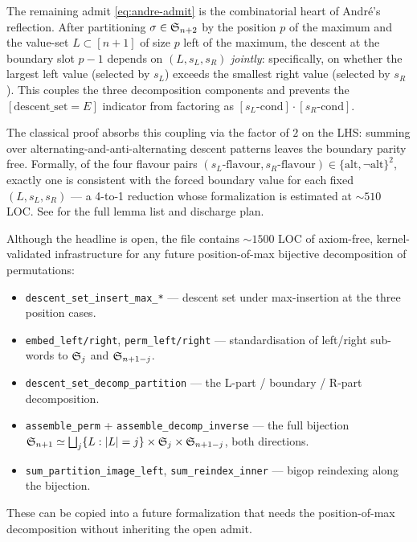 \begin{remark}
  The remaining admit \eqref{eq:andre-admit} is the combinatorial heart
  of André's reflection.  After partitioning $\sigma \in \mathfrak{S}_{n+2}$ by
  the position $p$ of the maximum and the value-set $L \subset [n+1]$
  of size $p$ left of the maximum, the descent at the boundary slot
  $p-1$ depends on $(L, s_L, s_R)$ \emph{jointly}: specifically, on
  whether the largest left value (selected by $s_L$) exceeds the
  smallest right value (selected by $s_R$).  This couples the three
  decomposition components and prevents the $[\mathrm{descent\_set} = E]$
  indicator from factoring as $[s_L\text{-cond}] \cdot [s_R\text{-cond}]$.

  The classical proof absorbs this coupling via the factor of $2$ on
  the LHS: summing over alternating-and-anti-alternating descent
  patterns leaves the boundary parity free.  Formally, of the four
  flavour pairs $(s_L\text{-flavour}, s_R\text{-flavour}) \in
  \{\mathrm{alt}, \neg\mathrm{alt}\}^2$, exactly one is consistent
  with the forced boundary value for each fixed $(L, s_L, s_R)$ — a
  4-to-1 reduction whose formalization is estimated at $\sim 510$ LOC.
  See  for the full
  lemma list and discharge plan.
\end{remark}

\begin{remark}
  Although the headline is open, the file
   contains $\sim 1500$ LOC of
  axiom-free, kernel-validated infrastructure for any future
  position-of-max bijective decomposition of permutations:
  \begin{itemize}
    \item \texttt{descent\_set\_insert\_max\_*} — descent set under
      max-insertion at the three position cases.
    \item \texttt{embed\_left/right}, \texttt{perm\_left/right} —
      standardisation of left/right sub-words to $\mathfrak{S}_{j}$ and
      $\mathfrak{S}_{n+1-j}$.
    \item \texttt{descent\_set\_decomp\_partition} — the L-part /
      boundary / R-part decomposition.
    \item \texttt{assemble\_perm} + \texttt{assemble\_decomp\_inverse}
      — the full bijection $\mathfrak{S}_{n+1} \simeq \bigsqcup_j \{L : |L|=j\}
      \times \mathfrak{S}_{j} \times \mathfrak{S}_{n+1-j}$, both directions.
    \item \texttt{sum\_partition\_image\_left}, \texttt{sum\_reindex\_inner}
      — bigop reindexing along the bijection.
  \end{itemize}
  These can be copied into a future formalization that needs the
  position-of-max decomposition without inheriting the open admit.
\end{remark}
